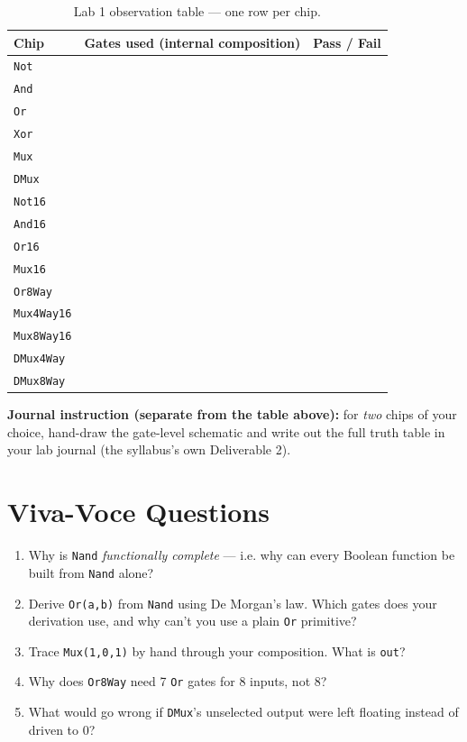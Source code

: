 \documentclass[11pt]{article}
\begin{document}
\begin{table}[h]
\centering
\small
\begin{tabular}{@{}l l c@{}}
\toprule
Chip & Gates used (internal composition) & Pass / Fail \\
\midrule
\texttt{Not} & & \\
\texttt{And} & & \\
\texttt{Or} & & \\
\texttt{Xor} & & \\
\texttt{Mux} & & \\
\texttt{DMux} & & \\
\texttt{Not16} & & \\
\texttt{And16} & & \\
\texttt{Or16} & & \\
\texttt{Mux16} & & \\
\texttt{Or8Way} & & \\
\texttt{Mux4Way16} & & \\
\texttt{Mux8Way16} & & \\
\texttt{DMux4Way} & & \\
\texttt{DMux8Way} & & \\
\bottomrule
\end{tabular}
\caption{Lab 1 observation table --- one row per chip.}
\label{tab:lab1-observations}
\end{table}

\noindent\textbf{Journal instruction (separate from the table above):} for \emph{two} chips of your choice, hand-draw the gate-level schematic and write out the full truth table in your lab journal (the syllabus's own Deliverable 2).

\section{Viva-Voce Questions}

\begin{enumerate}
  \item Why is \texttt{Nand} \emph{functionally complete} --- i.e. why can every Boolean function be built from \texttt{Nand} alone?
  \item Derive \texttt{Or(a,b)} from \texttt{Nand} using De Morgan's law. Which gates does your derivation use, and why can't you use a plain \texttt{Or} primitive?
  \item Trace \texttt{Mux(1,0,1)} by hand through your composition. What is \texttt{out}?
  \item Why does \texttt{Or8Way} need 7 \texttt{Or} gates for 8 inputs, not 8?
  \item What would go wrong if \texttt{DMux}'s unselected output were left floating instead of driven to 0?
\end{enumerate}
\end{document}
